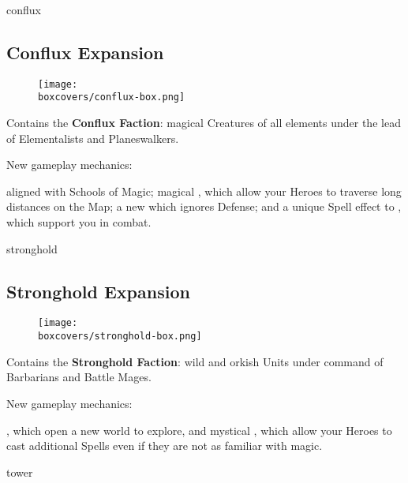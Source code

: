 \begin{multicols}{2}
\begin{expansion}[title=]{conflux}
  \subsection*{\color{conflux}Conflux Expansion}
  \setlength\intextsep{0pt}
  \setlength\columnsep{0.8em}
  \begin{wrapfigure}{l}{0.35\textwidth}
    \texttt{[image: \\boxcovers/conflux-box.png]}
  \end{wrapfigure}
  Contains the \textbf{Conflux Faction}: magical Creatures of all elements under the lead of Elementalists and Planeswalkers.\par
  \medskip
  New gameplay mechanics:\par
  \smallskip
   aligned with Schools of Magic; magical , which allow your Heroes to traverse long distances on the Map; a new  which ignores Defense; and a unique Spell effect to , which support you in combat.  %
\end{expansion}
\vspace*{\fill}

\columnbreak
\begin{expansion}[title=]{stronghold}
  \subsection*{\color{stronghold}Stronghold Expansion}
  \setlength\intextsep{0pt}
  \setlength\columnsep{0.8em}
  \begin{wrapfigure}{l}{0.35\textwidth}
    \texttt{[image: \\boxcovers/stronghold-box.png]}
  \end{wrapfigure}
  Contains the \textbf{Stronghold Faction}: wild and orkish Units under command of Barbarians and Battle Mages.\par
  \medskip
  New gameplay mechanics:\par
  \smallskip
  , which open a new world to explore, and mystical ,
  which allow your Heroes to cast additional Spells even if they are not as familiar with magic.
\end{expansion}

\vspace*{1em}
\begin{expansion}[title=]{tower}

\end{expansion}
\end{multicols}
